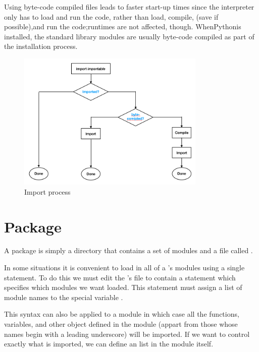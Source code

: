 Using byte-code compiled files leads to faster start-up times since the interpreter only has to load and run the code, rather than load, compile, (save if possible),and run the code;runtimes are not affected, though.
WhenPythonis installed, the standard library modules are usually byte-code compiled as part of the installation process.


\begin{figure}[!ht]
  \centering
  \includegraphics[width=0.8\textwidth]{images/import}
  \caption{Import process}
\end{figure}



\section{Package}
\label{cha:package}

A package is simply a directory that contains a set of modules and a file called .



In some situations it is convenient to load in all of a ’s modules using a single statement.
To do this we must edit the ’s  file to contain a statement which specifies which modules we want loaded.
This statement must assign a list of module names to the special variable .



This syntax can also be applied to a module in which case all the functions, variables, and other object defined in the module (appart from those whose names begin with a leading underscore) will be imported.
If we want to control exactly what is imported, we can define an  list in the module itself.

